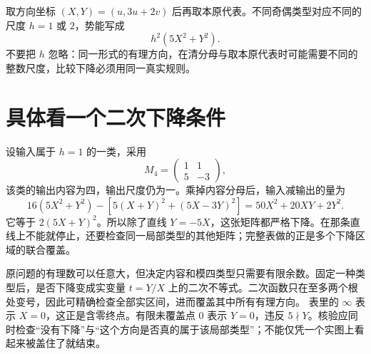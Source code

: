 取方向坐标 $(X,Y)=(u,3u+2v)$ 后再取本原代表。不同奇偶类型对应不同的尺度 $h=1$ 或 $2$，势能写成
\[h^2(5X^2+Y^2).
\]
不要把 $h$ 忽略：同一形式的有理方向，在清分母与取本原代表时可能需要不同的整数尺度，比较下降必须用同一真实规则。

\section{具体看一个二次下降条件}
设输入属于 $h=1$ 的一类，采用
\[M_4=\begin{pmatrix}1&1\\5&-3\end{pmatrix},
\]
该类的输出内容为四，输出尺度仍为一。乘掉内容分母后，输入减输出的量为
\[
16(5X^2+Y^2)-[5(X+Y)^2+(5X-3Y)^2]
=50X^2+20XY+2Y^2.
\]
它等于 $2(5X+Y)^2$。所以除了直线 $Y=-5X$，这张矩阵都严格下降。在那条直线上不能就停止，还要检查同一局部类型的其他矩阵；完整表做的正是多个下降区域的联合覆盖。

原问题的有理数可以任意大，但决定内容和模四类型只需要有限余数。固定一种类型后，是否下降变成实变量 $t=Y/X$ 上的二次不等式。二次函数只在至多两个根处变号，因此可精确检查全部实区间，进而覆盖其中所有有理方向。
表里的 $\infty$ 表示 $X=0$，这正是含零终点。有限未覆盖点 $0$ 表示 $Y=0$，违反 $5\nmid Y$。核验应同时检查“没有下降”与“这个方向是否真的属于该局部类型”；不能仅凭一个实图上看起来被盖住了就结束。
